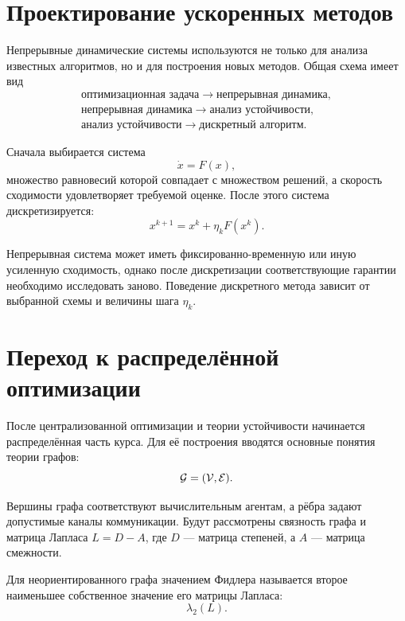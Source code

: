 \section{Проектирование ускоренных методов}

Непрерывные динамические системы используются не только для анализа
известных алгоритмов, но и для построения новых методов. Общая схема
имеет вид
\[
    \begin{gathered}
        \text{оптимизационная задача}
        \longrightarrow
        \text{непрерывная динамика},
        \\
        \text{непрерывная динамика}
        \longrightarrow
        \text{анализ устойчивости},
        \\
        \text{анализ устойчивости}
        \longrightarrow
        \text{дискретный алгоритм}.
    \end{gathered}
\]

Сначала выбирается система
\[
    \dot{x}=F(x),
\]
множество равновесий которой совпадает с множеством решений, а скорость
сходимости удовлетворяет требуемой оценке. После этого система
дискретизируется:
\[
    x^{k+1}
    =
    x^k+\eta_kF(x^k).
\]

Непрерывная система может иметь фиксированно-временную или иную
усиленную сходимость, однако после дискретизации соответствующие
гарантии необходимо исследовать заново. Поведение дискретного метода
зависит от выбранной схемы и величины шага \(\eta_k\).

\section{Переход к распределённой оптимизации}

После централизованной оптимизации и теории устойчивости начинается
распределённая часть курса. Для её построения вводятся основные
понятия теории графов:
\[
    \mathcal{G}=(\mathcal{V},\mathcal{E}).
\]

Вершины графа соответствуют вычислительным агентам, а рёбра задают
допустимые каналы коммуникации. Будут рассмотрены связность графа и
матрица Лапласа \(L=D-A\), где \(D\) --- матрица степеней, а \(A\) ---
матрица смежности.

\begin{definition}
Для неориентированного графа значением Фидлера называется второе
наименьшее собственное значение его матрицы Лапласа:
\[
    \lambda_2(L).
\]
\end{definition}

